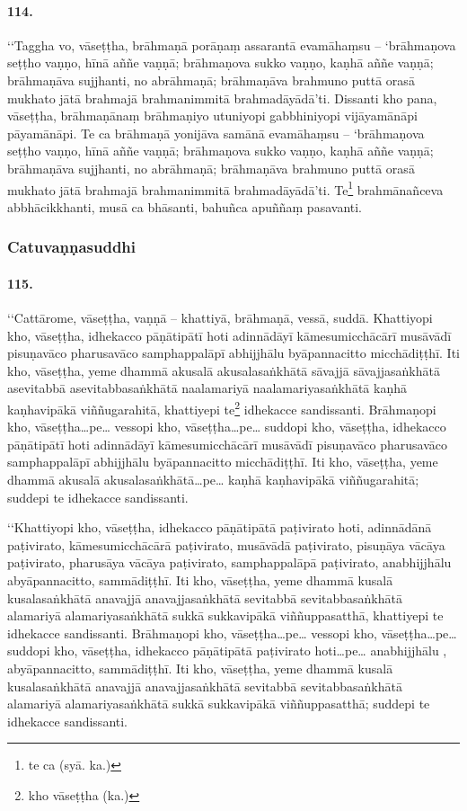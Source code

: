 \paragraph{114.} ‘‘Taggha vo, vāseṭṭha, brāhmaṇā porāṇaṃ assarantā evamāhaṃsu – ‘brāhmaṇova seṭṭho vaṇṇo, hīnā aññe vaṇṇā; brāhmaṇova sukko vaṇṇo, kaṇhā aññe vaṇṇā; brāhmaṇāva sujjhanti, no abrāhmaṇā; brāhmaṇāva brahmuno puttā orasā mukhato jātā brahmajā brahmanimmitā brahmadāyādā’ti. Dissanti kho pana, vāseṭṭha, brāhmaṇānaṃ brāhmaṇiyo utuniyopi gabbhiniyopi vijāyamānāpi pāyamānāpi. Te ca brāhmaṇā yonijāva samānā evamāhaṃsu – ‘brāhmaṇova seṭṭho vaṇṇo, hīnā aññe vaṇṇā; brāhmaṇova sukko vaṇṇo, kaṇhā aññe vaṇṇā; brāhmaṇāva sujjhanti, no abrāhmaṇā; brāhmaṇāva brahmuno puttā orasā mukhato jātā brahmajā brahmanimmitā brahmadāyādā’ti. Te\footnote{te ca (syā. ka.)} brahmānañceva abbhācikkhanti, musā ca bhāsanti, bahuñca apuññaṃ pasavanti.

\subsubsection{Catuvaṇṇasuddhi}

\paragraph{115.} ‘‘Cattārome, vāseṭṭha, vaṇṇā – khattiyā, brāhmaṇā, vessā, suddā. Khattiyopi kho, vāseṭṭha, idhekacco pāṇātipātī hoti adinnādāyī kāmesumicchācārī musāvādī pisuṇavāco pharusavāco samphappalāpī abhijjhālu byāpannacitto micchādiṭṭhī. Iti kho, vāseṭṭha, yeme dhammā akusalā akusalasaṅkhātā sāvajjā sāvajjasaṅkhātā asevitabbā asevitabbasaṅkhātā naalamariyā naalamariyasaṅkhātā kaṇhā kaṇhavipākā viññugarahitā, khattiyepi te\footnote{kho vāseṭṭha (ka.)} idhekacce sandissanti. Brāhmaṇopi kho, vāseṭṭha…pe… vessopi kho, vāseṭṭha…pe… suddopi kho, vāseṭṭha, idhekacco pāṇātipātī hoti adinnādāyī kāmesumicchācārī musāvādī pisuṇavāco pharusavāco samphappalāpī abhijjhālu byāpannacitto micchādiṭṭhī. Iti kho, vāseṭṭha, yeme dhammā akusalā akusalasaṅkhātā…pe… kaṇhā kaṇhavipākā viññugarahitā; suddepi te idhekacce sandissanti.

‘‘Khattiyopi kho, vāseṭṭha, idhekacco pāṇātipātā paṭivirato hoti, adinnādānā paṭivirato, kāmesumicchācārā paṭivirato, musāvādā paṭivirato, pisuṇāya vācāya paṭivirato, pharusāya vācāya paṭivirato, samphappalāpā paṭivirato, anabhijjhālu abyāpannacitto, sammādiṭṭhī. Iti kho, vāseṭṭha, yeme dhammā kusalā kusalasaṅkhātā anavajjā anavajjasaṅkhātā sevitabbā sevitabbasaṅkhātā alamariyā alamariyasaṅkhātā sukkā sukkavipākā viññuppasatthā, khattiyepi te idhekacce sandissanti. Brāhmaṇopi kho, vāseṭṭha…pe… vessopi kho, vāseṭṭha…pe… suddopi kho, vāseṭṭha, idhekacco pāṇātipātā paṭivirato hoti…pe… anabhijjhālu , abyāpannacitto, sammādiṭṭhī. Iti kho, vāseṭṭha, yeme dhammā kusalā kusalasaṅkhātā anavajjā anavajjasaṅkhātā sevitabbā sevitabbasaṅkhātā alamariyā alamariyasaṅkhātā sukkā sukkavipākā viññuppasatthā; suddepi te idhekacce sandissanti.

